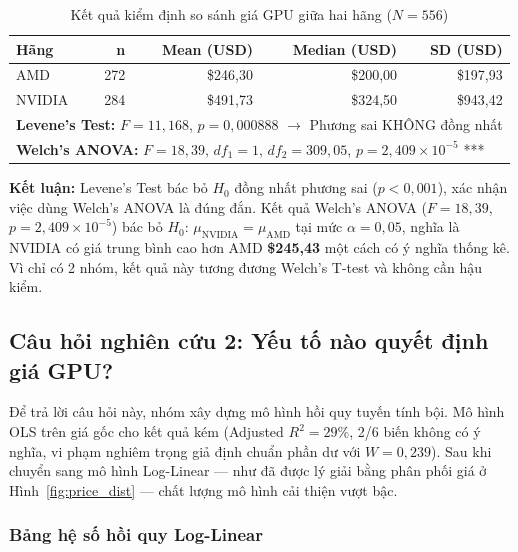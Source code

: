 \documentclass[a4paper]{article}
\begin{document}
\begin{table}[H]
\centering
\caption{Kết quả kiểm định so sánh giá GPU giữa hai hãng ($N = 556$)}
\label{tab:anova_result}
\begin{tabular}{|l|r|r|r|r|}
\hline
\textbf{Hãng} & \textbf{n} & \textbf{Mean (USD)} & \textbf{Median (USD)} & \textbf{SD (USD)} \\
\hline
AMD & 272 & \$246,30 & \$200,00 & \$197,93 \\
NVIDIA & 284 & \$491,73 & \$324,50 & \$943,42 \\
\hline
\multicolumn{5}{|l|}{\textbf{Levene's Test:} $F = 11{,}168$, $p = 0{,}000888$ $\to$ Phương sai KHÔNG đồng nhất} \\
\multicolumn{5}{|l|}{\textbf{Welch's ANOVA:} $F = 18{,}39$, $df_1 = 1$, $df_2 = 309{,}05$, $p = 2{,}409 \times 10^{-5}$ ***} \\
\hline
\end{tabular}
\end{table}

\textbf{Kết luận:} Levene's Test bác bỏ $H_0$ đồng nhất phương sai ($p < 0{,}001$), xác nhận việc dùng Welch's ANOVA là đúng đắn. Kết quả Welch's ANOVA ($F = 18{,}39$, $p = 2{,}409 \times 10^{-5}$) bác bỏ $H_0$: $\mu_{\mathrm{NVIDIA}} = \mu_{\mathrm{AMD}}$ tại mức $\alpha = 0{,}05$, nghĩa là NVIDIA có giá trung bình cao hơn AMD \textbf{\$245,43} một cách có ý nghĩa thống kê. Vì chỉ có 2 nhóm, kết quả này tương đương Welch's T-test và không cần hậu kiểm.

\subsection{Câu hỏi nghiên cứu 2: Yếu tố nào quyết định giá GPU?}

Để trả lời câu hỏi này, nhóm xây dựng mô hình hồi quy tuyến tính bội. Mô hình OLS trên giá gốc cho kết quả kém (Adjusted $R^2 = 29\%$, 2/6 biến không có ý nghĩa, vi phạm nghiêm trọng giả định chuẩn phần dư với $W = 0{,}239$). Sau khi chuyển sang mô hình Log-Linear --- như đã được lý giải bằng phân phối giá ở Hình~\ref{fig:price_dist} --- chất lượng mô hình cải thiện vượt bậc.

\subsubsection{Bảng hệ số hồi quy Log-Linear}
\end{document}
